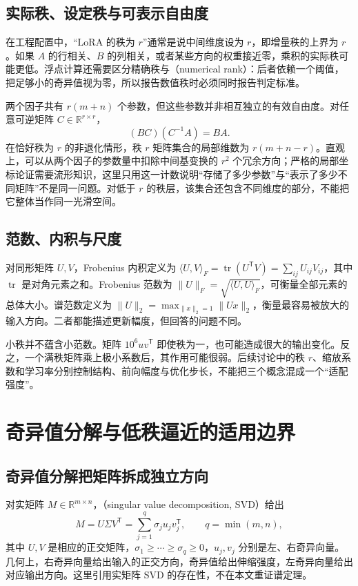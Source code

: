 \documentclass[UTF8,12pt,a4paper,fontset=fandol]{ctexart}
\begin{document}
\subsection{实际秩、设定秩与可表示自由度}

在工程配置中，“LoRA 的秩为 $r$”通常是说中间维度设为 $r$，即增量秩的上界为 $r$。如果 $A$ 的行相关、$B$ 的列相关，或者某些方向的权重接近零，乘积的实际秩可能更低。浮点计算还需要区分精确秩与（numerical rank）：后者依赖一个阈值，把足够小的奇异值视为零，所以报告数值秩时必须同时报告判定标准。

两个因子共有 $r(m+n)$ 个参数，但这些参数并非相互独立的有效自由度。对任意可逆矩阵 $C\in\mathbb R^{r\times r}$，
\[
(BC)(C^{-1}A)=BA.
\]
在恰好秩为 $r$ 的非退化情形，秩 $r$ 矩阵集合的局部维数为 $r(m+n-r)$。直观上，可以从两个因子的参数量中扣除中间基变换的 $r^2$ 个冗余方向；严格的局部坐标论证需要流形知识，这里只用这一计数说明“存储了多少参数”与“表示了多少不同矩阵”不是同一问题。对低于 $r$ 的秩层，该集合还包含不同维度的部分，不能把它整体当作同一光滑空间。

\subsection{范数、内积与尺度}

对同形矩阵 $U,V$，Frobenius 内积定义为
$\langle U,V\rangle_F=\operatorname{tr}(U^{\mathsf T}V)=\sum_{ij}U_{ij}V_{ij}$，其中 $\operatorname{tr}$ 是对角元素之和。Frobenius 范数为 $\|U\|_F=\sqrt{\langle U,U\rangle_F}$，可衡量全部元素的总体大小。谱范数定义为
$\|U\|_2=\max_{\|x\|_2=1}\|Ux\|_2$，衡量最容易被放大的输入方向。二者都能描述更新幅度，但回答的问题不同。

小秩并不蕴含小范数。矩阵 $10^6uv^{\mathsf T}$ 即使秩为一，也可能造成很大的输出变化。反之，一个满秩矩阵乘上极小系数后，其作用可能很弱。后续讨论中的秩 $r$、缩放系数和学习率分别控制结构、前向幅度与优化步长，不能把三个概念混成一个“适配强度”。

\section{奇异值分解与低秩逼近的适用边界}
\label{sec:svd}

\subsection{奇异值分解把矩阵拆成独立方向}

对实矩阵 $M\in\mathbb R^{m\times n}$，（singular value decomposition, SVD）给出
\[
M=U\Sigma V^{\mathsf T}
=\sum_{j=1}^{q}\sigma_ju_jv_j^{\mathsf T},
\qquad q=\min(m,n),
\]
其中 $U,V$ 是相应的正交矩阵，$\sigma_1\geq\cdots\geq\sigma_q\geq0$，$u_j,v_j$ 分别是左、右奇异向量。几何上，右奇异向量给出输入的正交方向，奇异值给出伸缩强度，左奇异向量给出对应输出方向。这里引用实矩阵 SVD 的存在性，不在本文重证谱定理。
\end{document}
